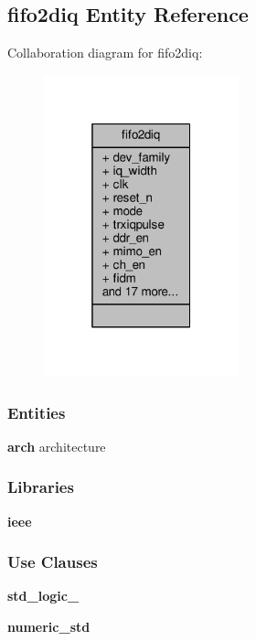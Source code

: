 \subsection{fifo2diq Entity Reference}
\label{classfifo2diq}


Collaboration diagram for fifo2diq\+:\nopagebreak
\begin{figure}[H]
\begin{center}
\leavevmode
\includegraphics[width=160pt]{dc/d98/classfifo2diq__coll__graph}
\end{center}
\end{figure}
\subsubsection*{Entities}
\begin{DoxyCompactItemize}
\item 
{\bf arch} architecture
\end{DoxyCompactItemize}
\subsubsection*{Libraries}
 \begin{DoxyCompactItemize}
\item 
{\bf ieee} 
\end{DoxyCompactItemize}
\subsubsection*{Use Clauses}
 \begin{DoxyCompactItemize}
\item 
{\bf std\+\_\+logic\+\_}   
\item 
{\bf numeric\+\_\+std}   
\end{DoxyCompactItemize}
